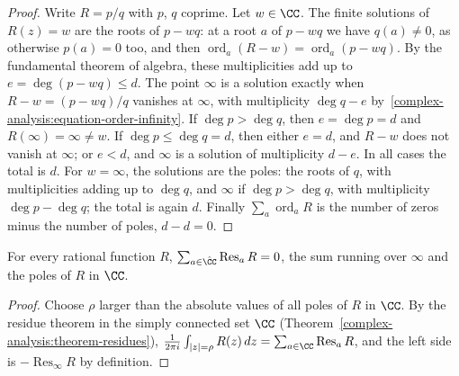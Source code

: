 \begin{proof}
Write $R = p/q$ with $p$, $q$ coprime. Let $w \in \CC$. The finite solutions of $R(z) = w$ are the roots of $p - wq$: at a root $a$ of $p - wq$ we have $q(a) \neq 0$, as otherwise $p(a) = 0$ too, and then
$\operatorname{ord}_a(R - w) = \operatorname{ord}_a(p - wq)$. By the fundamental theorem of algebra, these multiplicities add up to $e = \deg(p - wq) \leq d$. The point $\infty$ is a solution exactly when
$R - w = (p - wq)/q$ vanishes at $\infty$, with multiplicity $\deg q - e$ by~\eqref{complex-analysis:equation-order-infinity}. If $\deg p > \deg q$, then $e = \deg p = d$ and $R(\infty) = \infty \neq w$. If
$\deg p \leq \deg q = d$, then either $e = d$, and $R - w$ does not vanish at $\infty$; or $e < d$, and $\infty$ is a solution of multiplicity $d - e$. In all cases the total is $d$. For $w = \infty$, the solutions
are the poles: the roots of $q$, with multiplicities adding up to $\deg q$, and $\infty$ if $\deg p > \deg q$, with multiplicity $\deg p - \deg q$; the total is again $d$. Finally $\sum_a\operatorname{ord}_aR$ is the number
of zeros minus the number of poles, $d - d = 0$.
\end{proof}

\begin{proposition}\label{complex-analysis:proposition-residues-sphere}
For every rational function $R$, $\sum_{a \in \hat{\CC}}\operatorname{Res}_aR = 0$, the sum running over $\infty$ and the poles of $R$ in $\CC$.
\end{proposition}

\begin{proof}
Choose $\rho$ larger than the absolute values of all poles of $R$ in $\CC$. By the residue theorem in the simply connected set $\CC$ (Theorem~\ref{complex-analysis:theorem-residues}),
$\frac{1}{2\pi i}\int_{|z| = \rho}R(z)\,dz = \sum_{a \in \CC}\operatorname{Res}_aR$, and the left side is $-\operatorname{Res}_\infty R$ by definition.
\end{proof}

